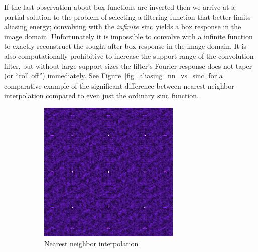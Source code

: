  
 If the last observation about box functions are inverted then we arrive at a partial solution to the problem of selecting a filtering function
 that better limits aliasing energy; convolving with the \emph{infinite} $\operatorname*{sinc}$ yields a box response in the image domain. Unfortunately it is 
 impossible to convolve with a infinite function to exactly reconstruct the sought-after box response in the image domain. It is also computationally
 prohibitive to increase the support range of the convolution filter, but without large support sizes the filter's Fourier response does not taper (or 
 ``roll off'') immediately. See Figure~\ref{fig_aliasing_nn_vs_sinc} for a comparative example of the significant difference between nearest neighbor 
 interpolation compared to even just the ordinary $\operatorname*{sinc}$ function.
 \begin{figure}[h]
  \begin{mdframed}
    \centering
    \begin{subfigure}[b]{0.35\textwidth}
      \includegraphics[width=\textwidth]{images/ratt_aa_kernel_demo_nn.png}
      \caption{Nearest neighbor interpolation}
    \end{subfigure}
    \begin{subfigure}[b]{0.35\textwidth}

\end{subfigure}
\end{mdframed}
\end{figure}
